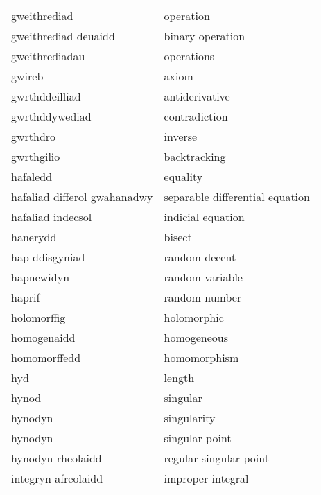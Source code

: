 \begin{supertabular}{p{0.22\textwidth}p{0.22\textwidth}}
                    gweithrediad &                         operation \\
            gweithrediad deuaidd &                  binary operation \\
                  gweithrediadau &                        operations \\
                          gwireb &                             axiom \\
                  gwrthddeilliad &                    antiderivative \\
                  gwrthddywediad &                     contradiction \\
                        gwrthdro &                           inverse \\
                      gwrthgilio &                      backtracking \\
                        hafaledd &                          equality \\
    hafaliad differol gwahanadwy &   separable differential equation \\
               hafaliad indecsol &                 indicial equation \\
                        hanerydd &                            bisect \\
                  hap-ddisgyniad &                     random decent \\
                      hapnewidyn &                   random variable \\
                          haprif &                     random number \\
                     holomorffig &                       holomorphic \\
                     homogenaidd &                       homogeneous \\
                    homomorffedd &                      homomorphism \\
                             hyd &                            length \\
                           hynod &                          singular \\
                         hynodyn &                       singularity \\
                         hynodyn &                    singular point \\
               hynodyn rheolaidd &            regular singular point \\
             integryn afreolaidd &                 improper integral \\

\end{supertabular}
